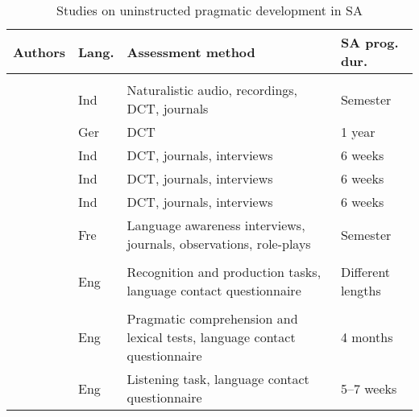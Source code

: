 \documentclass[output=paper]{langscibook}
\begin{document}
\begin{table}
\small
\begin{tabularx}{\textwidth}{>{\raggedright\arraybackslash}p{2.5cm}lQp{2cm}}
		\lsptoprule
  Authors & Lang. & Assessment method & SA prog. dur.\\
  \midrule
		 \\
		\citet{Dufon1999}     & Ind & Naturalistic audio, recordings, DCT, journals                         & Semester  \\
		\citet{Barron2006}    & Ger     & DCT              							  & 1 year  \\
		\citet{Hassall2013}   & Ind & DCT, journals, interviews                    & 6 weeks \\
		\citet{Hassall2015b}  & Ind & DCT, journals, interviews      			  &	6 weeks \\
		\citet{Hassall2015a}  & Ind & DCT, journals, interviews      			  &	6 weeks \\
		\citet{Kinginger2008} & Fre     & Language awareness  interviews, journals, observations, role-plays      			  	  &	Semester  \\
		\midrule
		 \\
		\citet{Bardovi-HarligBastos2011} & Eng & Recognition and production tasks, language contact questionnaire    		  & Different  lengths  \\
	    \midrule
       \\
	    \citet{Taguchi2008a}  & Eng & Pragmatic comprehension and lexical tests, language contact questionnaire   & 4 months \\
	    \citet{Taguchi2008b}  & Eng & Listening task, language contact questionnaire    & 5--7 weeks   \\
		\midrule
\end{tabularx}
\caption{Studies on uninstructed pragmatic development in SA\label{tab:4:3}}
\end{table}
\end{document}

